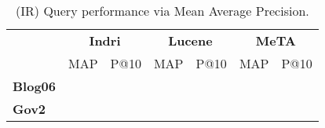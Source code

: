 \begin{table}[t]
\centering
{\small
\begin{tabular}{|l|cc|cc|cc|}
    \hline &
    \multicolumn{2}{c|}{\textbf{Indri}} &
    \multicolumn{2}{c|}{\textbf{Lucene}} &
    \multicolumn{2}{c|}{\textbf{MeTA}} \\
    & MAP & P@10 & MAP & P@10 & MAP & P@10\\
    \hline
    \textbf{Blog06} & & & & & & \\
    \textbf{Gov2} & & & & & & \\
    \hline
\end{tabular}
\caption{(IR) Query performance via Mean Average Precision.}
\label{table:ir-map}
}
\end{table}
